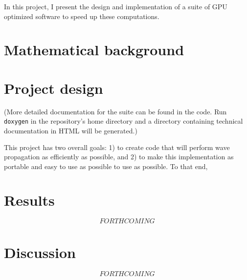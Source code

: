\documentclass{article}
\theoremstyle{exampstyle} \newtheorem*{remark}{Remark}
\newcommand{\1}{\mathds{1}}
\begin{document}
In this project, I present the design and implementation of a suite of GPU optimized software to speed up these computations. %


\section{Mathematical background}


\section{Project design}

(More detailed documentation for the suite can be found in the code. Run \texttt{doxygen} in the repository's home directory and a directory containing technical documentation in HTML will be generated.)

This project has two overall goals: 1) to create code that will perform wave propagation as efficiently as possible, and 2) to make this implementation as portable and easy to use as possible to use as possible. To that end,

\section{Results}

$$ FORTHCOMING $$

\section{Discussion}

$$ FORTHCOMING $$
\end{document}
